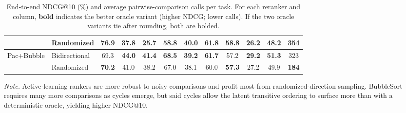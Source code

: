 \documentclass{llmxive}
\begin{document}
\begin{table}[!t]
\begin{adjustbox}{max width=\textwidth}
\begin{tabular}{llcccccccccc}
& Randomized
& \textbf{76.9} & \textbf{37.8} & 25.7 & \textbf{58.8} & \textbf{40.0} & 61.8 & \textbf{58.8} & \textbf{26.2} & \textbf{48.2} & \textbf{354} \\
\midrule
\multirow{2}{*}{Pac+Bubble} & Bidirectional
& 69.3 & \textbf{44.0} & \textbf{41.4} & \textbf{68.5} & \textbf{39.2} & \textbf{61.7} & 57.2 & \textbf{29.2} & \textbf{51.3} & 323 \\
& Randomized
& \textbf{70.2} & 41.0 & 38.2 & 67.0 & 38.1 & 60.0 & \textbf{57.3} & 27.2 & 49.9 & \textbf{184} \\
\bottomrule
\end{tabular}
\end{adjustbox}
\caption{
End-to-end NDCG@10 (\%) and average pairwise-comparison calls per task. For each reranker and column, \textbf{bold} indicates the better oracle variant (higher NDCG; lower calls).
If the two oracle variants tie after rounding, both are bolded.
}
\label{tab:reranker_oracle_compare}
\par\vspace{2pt}\footnotesize\noindent\textit{Note.} Active-learning rankers are more robust to noisy comparisons and profit most from randomized-direction sampling. BubbleSort requires many more comparisons as cycles emerge, but said cycles allow the latent transitive ordering to surface more than with a deterministic oracle, yielding higher NDCG@10.

\end{table}
\end{document}
